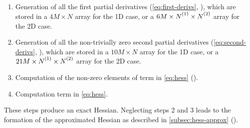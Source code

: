\begin{enumerate}
    \item Generation of all the first partial derivatives
        (\cref{eq:first-derivs}, ), which are stored
        in a $4M \times N$ array for the \ac{1D} case, or a $6M \times \None
        \times \Ntwo$ array for the \ac{2D} case.
    \item Generation of all the non-trivially zero second partial
        derivatives (\cref{eq:second-derivs}, ),
        which are stored in a $10M \times N$ array for the \ac{1D} case, or a
        $21M \times \None \times \Ntwo$ array for the \ac{2D} case.
    \item Computation of the non-zero elements of term  in
        \cref{eq:hess} ().
    \item Computation term  in \cref{eq:hess}.
\end{enumerate}
These steps produce an exact Hessian. Neglecting steps 2 and 3 leads to the
formation of the approximated Hessian as described in \cref{subsec:hess-approx}
().

